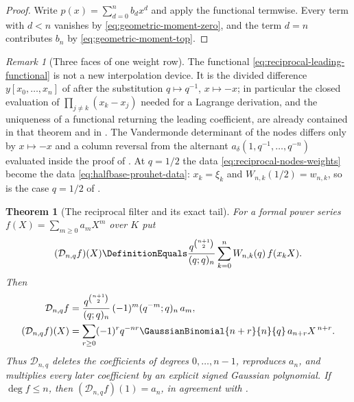 \documentclass[11pt,a4paper,oneside,openany]{book}
\newtheorem{theorem}{Theorem}[chapter]
\theoremstyle{definition}
\theoremstyle{remark}
\newtheorem{remark}[remark]{Remark}
\begin{document}
\begin{proof}
Write $p(x)=\sum_{d=0}^{n}b_dx^d$ and apply the functional termwise.  Every term with $d<n$ vanishes by \eqref{eq:geometric-moment-zero}, and the term $d=n$ contributes $b_n$ by \eqref{eq:geometric-moment-top}.
\end{proof}

\begin{remark}[Three faces of one weight row]\label{rem:reciprocal-weight-faces}
The functional \eqref{eq:reciprocal-leading-functional} is not a new interpolation device.  It is the divided difference $y[x_0,\ldots,x_n]$ of  after the substitution $q\mapsto q^{-1}$, $x\mapsto-x$; in particular the closed evaluation of $\prod_{j\ne k}(x_k-x_j)$ needed for a Lagrange derivation, and the uniqueness of a functional returning the leading coefficient, are already contained in that theorem and in .  The Vandermonde determinant of the nodes differs only by $x\mapsto-x$ and a column reversal from the alternant $a_\delta(1,q^{-1},\ldots,q^{-n})$ evaluated inside the proof of .  At $q=1/2$ the data \eqref{eq:reciprocal-nodes-weights} become the data \eqref{eq:halfbase-prouhet-data}: $x_k=\xi_k$ and $W_{n,k}(1/2)=w_{n,k}$, so  is the case $q=1/2$ of .
\end{remark}

\begin{theorem}[The reciprocal filter and its exact tail]\label{thm:reciprocal-exact-tail}
For a formal power series $f(X)=\sum_{m\ge0}a_mX^m$ over $K$ put
\begin{equation}\label{eq:reciprocal-filter-definition}
 (\mathcal D_{n,q}f)(X)
 \DefinitionEquals\frac{q^{\binom{n+1}{2}}}{(q;q)_n}
   \sum_{k=0}^{n}W_{n,k}(q)\,f(x_kX).
\end{equation}
Then
\begin{align}
 [X^m]\mathcal D_{n,q}f
 &=\frac{q^{\binom{n+1}{2}}}{(q;q)_n}\,(-1)^m(q^{-m};q)_n\,a_m,
 \label{eq:reciprocal-filter-diagonal}\\
 (\mathcal D_{n,q}f)(X)
 &=\sum_{r\ge0}(-1)^rq^{-nr}\GaussianBinomial{n+r}{n}{q}\,a_{n+r}X^{\,n+r}.
 \label{eq:reciprocal-filter-tail}
\end{align}
Thus $\mathcal D_{n,q}$ deletes the coefficients of degrees $0,\ldots,n-1$, reproduces $a_n$, and multiplies every later coefficient by an explicit signed Gaussian polynomial.  If $\deg f\le n$, then $(\mathcal D_{n,q}f)(1)=a_n$, in agreement with .
\end{theorem}
\end{document}
